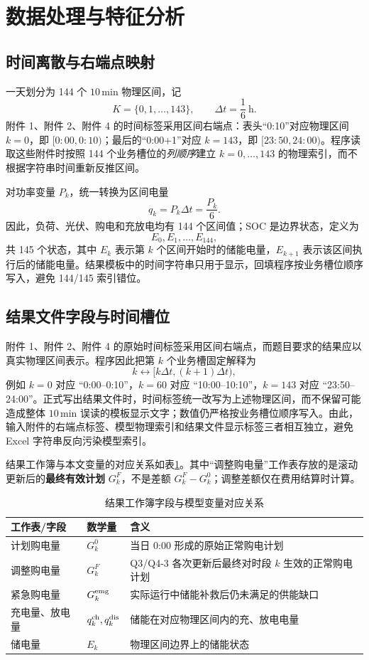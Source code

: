 \documentclass[withoutpreface]{cumcmthesis}
\newcommand{\dt}{\Delta t}
\begin{document}
\section{数据处理与特征分析}
\subsection{时间离散与右端点映射}
一天划分为 144 个 $10\,\mathrm{min}$ 物理区间，记
\[
K=\{0,1,\ldots,143\},\qquad \dt=\frac{1}{6}\ \mathrm h.
\]
附件 1、附件 2、附件 4 的时间标签采用区间右端点：表头“0:10”对应物理区间 $k=0$，即 $[0{:}00,0{:}10)$；最后的“0:00+1”对应 $k=143$，即 $[23{:}50,24{:}00)$。程序读取这些附件时按照 144 个业务槽位的\emph{列顺序}建立 $k=0,\ldots,143$ 的物理索引，而不根据字符串时间重新反推区间。

对功率变量 $P_k$，统一转换为区间电量
\begin{equation}
q_k=P_k\dt=\frac{P_k}{6}.
\end{equation}
因此，负荷、光伏、购电和充放电均有 144 个区间值；SOC 是边界状态，定义为
\[
E_0,E_1,\ldots,E_{144},
\]
共 145 个状态，其中 $E_k$ 表示第 $k$ 个区间开始时的储能电量，$E_{k+1}$ 表示该区间执行后的储能电量。结果模板中的时间字符串只用于显示，回填程序按业务槽位顺序写入，避免 144/145 索引错位。

\subsection{结果文件字段与时间槽位}
附件 1、附件 2、附件 4 的原始时间标签采用区间右端点，而题目要求的结果应以真实物理区间表示。程序因此把第 $k$ 个业务槽固定解释为
\[
k\longleftrightarrow[k\Delta t,(k+1)\Delta t),
\]
例如 $k=0$ 对应 ``0:00--0:10''，$k=60$ 对应 ``10:00--10:10''，$k=143$ 对应 ``23:50--24:00''。正式写出结果文件时，时间标签统一改写为上述物理区间，而不保留可能造成整体 $10\,\mathrm{min}$ 误读的模板显示文字；数值仍严格按业务槽位顺序写入。由此，输入附件的右端点标签、模型物理索引和结果文件显示标签三者相互独立，避免 Excel 字符串反向污染模型索引。

结果工作簿与本文变量的对应关系如表\ref{tab:result_mapping}。其中“调整购电量”工作表存放的是滚动更新后的\textbf{最终有效计划} $G_k^F$，不是差额 $G_k^F-G_k^0$；调整差额仅在费用结算时计算。

\begin{table}[H]
\centering
\caption{结果工作簿字段与模型变量对应关系}
\label{tab:result_mapping}
\small
\begin{tabularx}{\textwidth}{>{\centering\arraybackslash}p{2.6cm} >{\centering\arraybackslash}p{2.2cm} X}
\toprule
工作表/字段 & 数学量 & 含义\\
\midrule
计划购电量 & $G_k^0$ & 当日 0:00 形成的原始正常购电计划\\
调整购电量 & $G_k^F$ & Q3/Q4-3 各次更新后最终对时段 $k$ 生效的正常购电计划\\
紧急购电量 & $G_k^{\rm emg}$ & 实际运行中储能补救后仍未满足的供能缺口\\
充电量、放电量 & $q_k^{\rm ch},q_k^{\rm dis}$ & 储能在对应物理区间内的充、放电电量\\
储电量 & $E_k$ & 物理区间边界上的储能状态\\
\bottomrule
\end{tabularx}
\end{table}
\end{document}

